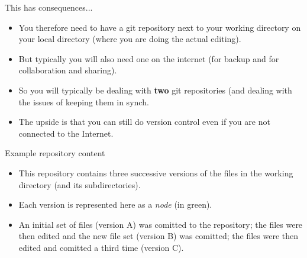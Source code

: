 \documentclass[usenames,dvipsnames]{beamer}
\begin{document}
\begin{frame}{This has consequences...}
  \begin{block}{}
    \begin{itemize}
      \item{You therefore need to have a git repository next to your working directory on your local directory (where you are doing the actual editing).}
      \item{But typically you will also need one on the internet (for backup and for collaboration and sharing).}
      \item{So you will typically be dealing with \textbf{two} git repositories (and dealing with the issues of keeping them in synch.}
    \end{itemize}
    \begin{itemize}
      \item{The upside is that you can still do version control even if you are not connected to the Internet.}
    \end{itemize}
  \end{block}
\end{frame}

\begin{frame}{Example repository content}
  \begin{figure}
    \begin{center}
    \end{center}
  \end{figure}
  \begin{block}{}
    \begin{itemize}
      \item{This repository contains three successive versions of the files in the working directory (and its subdirectories).}
      \item{Each version is represented here as a \textit{node} (in green).}
      \item{An initial set of files (version A) was comitted to the repository; the files were then edited and the new file set (version B) was comitted; the files were then edited and comitted a third time (version C).}
    \end{itemize}
  \end{block}
\end{frame}
\end{document}
